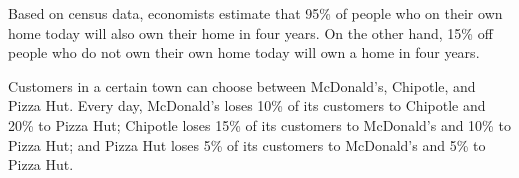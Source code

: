 \documentclass[12pt]{exam}
\begin{document}
\begin{questions}
\question
Based on census data, economists estimate that 95\% of people who on their own home today will also own their home in four years.  On the other hand, 15\% off people who do not own their own home today will own a home in four years.  


\question
Customers in a certain town can choose between McDonald's, Chipotle, and Pizza Hut.  Every day, McDonald's loses 10\% of its customers to Chipotle and 20\% to Pizza Hut; Chipotle loses 15\% of its customers to McDonald's and 10\% to Pizza Hut; and Pizza Hut loses 5\% of its customers to McDonald's and 5\% to Pizza Hut.  
\end{questions}
\end{document}
